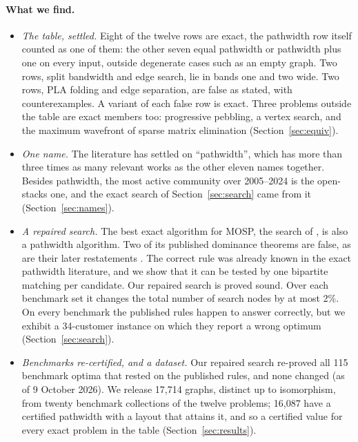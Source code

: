 \paragraph{What we find.}
\begin{itemize}
\item \emph{The table, settled.} Eight of the twelve rows are exact, the
  pathwidth row itself counted as one of them: the other seven equal pathwidth
  or pathwidth plus one on every input, outside degenerate cases such as an
  empty graph. Two rows, split bandwidth and edge
  search, lie in bands one and two wide. Two rows, PLA folding and edge
  separation, are false as stated, with counterexamples. A variant of each
  false row is exact. Three problems outside the table are exact members
  too: progressive pebbling, a vertex search, and the maximum wavefront of
  sparse matrix elimination (Section~\ref{sec:equiv}).
\item \emph{One name.} The literature has settled on ``pathwidth'', which has
  more than three times as many relevant works as the other eleven names
  together. Besides pathwidth, the most active community over 2005--2024 is the
  open-stacks one, and the exact search of Section~\ref{sec:search} came
  from it
  (Section~\ref{sec:names}).
\item \emph{A repaired search.} The best exact algorithm for MOSP, the search of
  \citet{ChuStuckey2009}, is also a pathwidth algorithm. Two of its published
  dominance theorems are false, as are their later restatements
  \citep{Chu2011,Fink2012}. The correct rule was already known in the exact
  pathwidth literature, and we show that it can be tested by one bipartite
  matching per candidate. Our repaired search is proved sound. Over each
  benchmark set it changes the total number of search nodes by at most 2\%. On
  every benchmark the published rules happen to answer correctly, but we
  exhibit a 34-customer instance on which they report a wrong optimum
  (Section~\ref{sec:search}).
\item \emph{Benchmarks re-certified, and a dataset.} Our repaired search
  re-proved all 115 benchmark optima that rested on the published rules, and
  none changed (as of 9 October 2026). We release 17,714 graphs, distinct up to
  isomorphism, from twenty benchmark collections of the twelve problems; 16,087
  have a certified pathwidth with a layout that attains it, and so a certified
  value for every exact problem in the table (Section~\ref{sec:results}).
\end{itemize}

